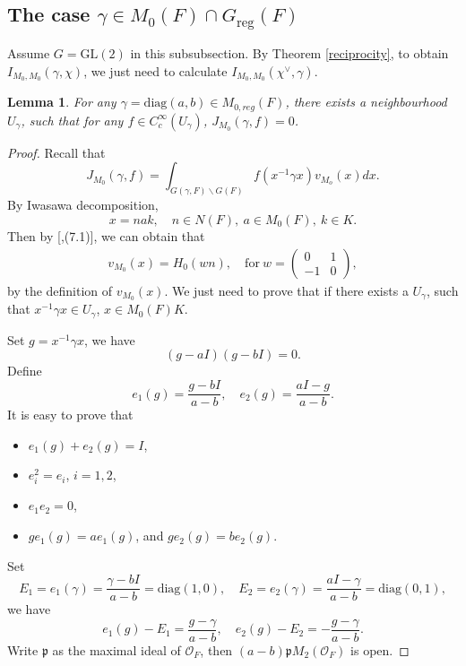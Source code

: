 \documentclass[11pt]{amsart}
\newtheorem {lemma}      [theorem]    {Lemma}
\renewcommand{\rm}{\mathrm}
\newcommand{\GGL}{\mathrm{GL}}
\theoremstyle{definition}
\numberwithin{equation}{section}
\begin{document}
    \subsection{The case \(\gamma\in M_0(F)\cap G_{\rm{reg}}(F)\)}
	Assume \(G=\GGL(2)\) in this subsubsection.
	By Theorem \ref{reciprocity}, to obtain \(I_{M_0,M_0}(\gamma,\chi)\), we just need to calculate \(I_{M_0,M_0}(\chi^\vee,\gamma)\).
	\begin{lemma}\label{local0}
		For any \(\gamma=\rm{diag}(a,b)\in M_{0,reg}(F)\), there exists a neighbourhood \(U_\gamma\), such that for any \(f\in C_c^\infty(U_\gamma)\), \(J_{M_0}(\gamma,f)=0\).
	\end{lemma}
	\begin{proof}
		Recall that 
		\[J_{M_0}(\gamma,f)=\int_{G(\gamma,F)\backslash G(F)}f(x^{-1}\gamma x)v_{M_o}(x)dx.\]
		By Iwasawa decomposition, \[x=nak,\quad n\in N(F),\ a\in M_0(F),\ k\in K.\]
		Then by [\cite{Art74},(7.1)], we can obtain that 
		\begin{align}
			v_{M_0}(x)=H_0(wn),\quad \text{for}\ w=\left(\begin{matrix}
				0&1\\
				-1&0
			\end{matrix}\right),
		\end{align}
		by the definition of \(v_{M_0}(x)\).
		We just need to prove that if there exists a \(U_\gamma\), such that \(x^{-1}\gamma x\in U_\gamma\), \(x\in M_0(F)K\).
		
		
		Set \(g=x^{-1}\gamma x\), we have \[(g-aI)(g-bI)=0.\]
		Define \[e_1(g)=\frac{g-bI}{a-b},\quad e_2(g)=\frac{aI-g}{a-b}.\]
		It is easy to prove that 
		\begin{itemize}
			\item \(e_1(g)+e_2(g)=I\),
			\item \(e_i^2=e_i\), \(i=1,2\),
			\item \(e_1e_2=0\),
			\item \(ge_1(g)=ae_1(g)\), and \(ge_2(g)=be_2(g)\).
		\end{itemize}
		Set \[E_1=e_1(\gamma)=\frac{\gamma-bI}{a-b}=\rm{diag}(1,0),\quad E_2=e_2(\gamma)=\frac{aI-\gamma}{a-b}=\rm{diag}(0,1),\]
		we have \[e_1(g)-E_1=\frac{g-\gamma}{a-b},\quad e_2(g)-E_2=-\frac{g-\gamma}{a-b}.\]
		Write \(\mathfrak{p}\) as the maximal ideal of \(\mathcal{O}_F\), then \((a-b)\mathfrak{p}M_2(\mathcal{O}_F)\) is open.
		

\end{proof}
\end{document}
